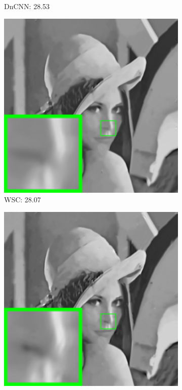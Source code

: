\begin{figure}
\begin{adjustwidth}{-2cm}{}
\begin{subfigure}[t]{0.19\textwidth}
		\caption{DnCNN: 28.53}
    \end{subfigure}
    \hfill
    \begin{subfigure}[t]{0.19\textwidth}
        \centering
        \includegraphics[width=1\textwidth]{images/twsc/awgn/resize_br_WSC_60_lena.png}
		\caption{WSC: 28.07}
    \end{subfigure}
    \hfill
    \begin{subfigure}[t]{0.19\textwidth}
        \centering
        \includegraphics[width=1\textwidth]{images/twsc/awgn/resize_br_WLSWSC_60_lena.png}

\end{subfigure}
\end{adjustwidth}
\end{figure}
